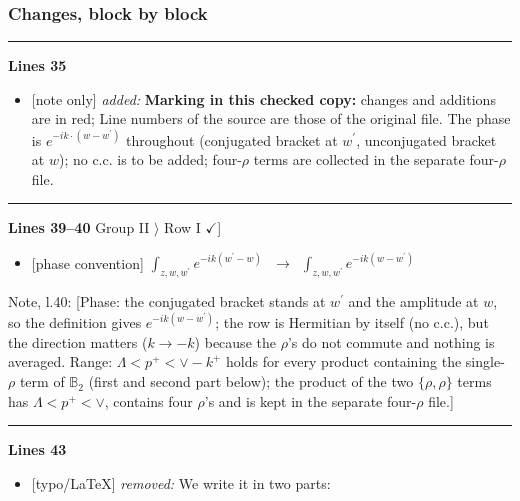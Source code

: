 \documentclass[10pt]{article}
\newenvironment{notebox}{\def\FrameCommand{{\color{notebar}\vrule width 1.5pt}\hspace{6pt}}\MakeFramed{\advance\hsize-\width\FrameRestore}\small}{\endMakeFramed}
\def\mf#1{\mathbb{#1}}
\begin{document}
\subsubsection*{Changes, block by block}
\noindent\rule{\linewidth}{0.3pt}\par\noindent\textbf{Lines 35}\par
\begin{itemize}[leftmargin=2.2em,itemsep=1pt,topsep=2pt]
\item[\textbf{l.35}] \textsf{\small [note only]} \emph{added:} \textbf{Marking in this checked copy:} changes and additions are in red;  Line numbers of the source are those of the original file. The phase is $e^{-ik\cdot(w-w^{\prime})}$ throughout (conjugated bracket at $w^{\prime}$, unconjugated bracket at $w$); no c.c. is to be added; four-$\rho$ terms are collected in the separate four-$\rho$ file.
\end{itemize}
\noindent\rule{\linewidth}{0.3pt}\par\noindent\textbf{Lines 39--40} \quad \textsf{Group II $\rangle$ Row I { $\checkmark$]}} \par
\begin{itemize}[leftmargin=2.2em,itemsep=1pt,topsep=2pt]
\item[\textbf{l.39}] \textsf{\small [phase convention]} $\displaystyle \int_{z,w,w^{\prime}} e^{-ik(w^{\prime}-w)}\,$\ $\longrightarrow$\ $\displaystyle \int_{z,w,w^{\prime}} e^{-ik(w-w^{\prime})}\,$
\end{itemize}
\begin{notebox}\textsf{\small Note, l.40:} [Phase: the conjugated bracket stands at $w^\prime$ and the amplitude at $w$, so the definition gives $e^{-ik(w-w^\prime)}$; the row is Hermitian by itself (no c.c.), but the direction matters ($k\to-k$) because the $\rho$'s do not commute and nothing is averaged. Range: $\Lambda<p^+<\vee-k^+$ holds for every product containing the single-$\rho$ term of $\mf{B}_2$ (first and second part below); the product of the two $\{\rho,\rho\}$ terms has $\Lambda<p^+<\vee$, contains four $\rho$'s and is kept in the separate four-$\rho$ file.]\end{notebox}
\noindent\rule{\linewidth}{0.3pt}\par\noindent\textbf{Lines 43}\par
\begin{itemize}[leftmargin=2.2em,itemsep=1pt,topsep=2pt]
\item[\textbf{l.43}] \textsf{\small [typo/LaTeX]} \emph{removed:} We write it in two parts:
\end{itemize}
\end{document}
